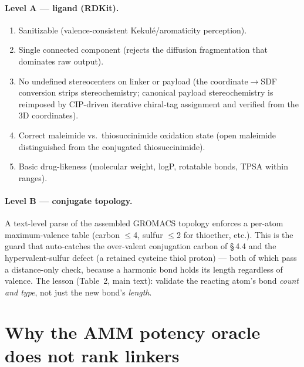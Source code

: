 \documentclass[10pt]{article}
\begin{document}
\paragraph{Level A --- ligand (RDKit\cite{rdkit}).}
\begin{enumerate}[leftmargin=1.4em,itemsep=1pt,topsep=2pt]
\item Sanitizable (valence-consistent Kekul\'e/aromaticity perception).
\item Single connected component (rejects the diffusion fragmentation that dominates raw output).
\item No undefined stereocenters on linker or payload (the coordinate$\rightarrow$SDF conversion strips
stereochemistry; canonical payload stereochemistry is reimposed by CIP-driven iterative chiral-tag
assignment and verified from the 3D coordinates).
\item Correct maleimide vs.\ thiosuccinimide oxidation state (open maleimide 
distinguished from the conjugated thiosuccinimide).
\item Basic drug-likeness (molecular weight, logP, rotatable bonds, TPSA within ranges).
\end{enumerate}

\paragraph{Level B --- conjugate topology.}
A text-level parse of the assembled GROMACS topology enforces a per-atom maximum-valence table (carbon
$\leq$4, sulfur $\leq$2 for thioether, etc.). This is the guard that auto-catches the over-valent
conjugation carbon of \S\,4.4 and the hypervalent-sulfur defect (a retained cysteine thiol proton) ---
both of which pass a distance-only check, because a harmonic bond holds its length regardless of valence.
The lesson (Table~2, main text): validate the reacting atom's bond \emph{count and type}, not just the
new bond's \emph{length}.

\section{Why the AMM potency oracle does not rank linkers}
\label{si:amm}
\end{document}
